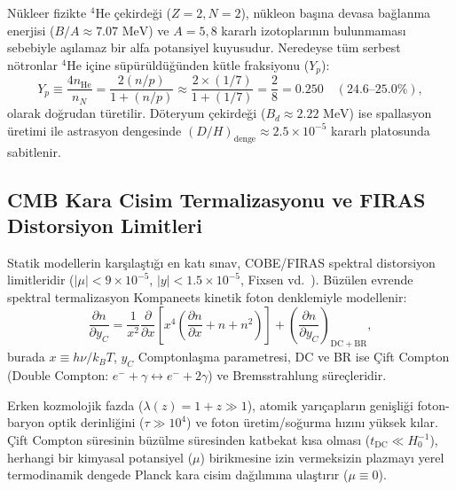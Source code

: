 \documentclass[11pt,a4paper]{article}
\begin{document}
Nükleer fizikte $^4\mathrm{He}$ çekirdeği ($Z=2, N=2$), nükleon başına devasa bağlanma enerjisi ($B/A \approx 7.07\text{ MeV}$) ve $A=5, 8$ kararlı izotoplarının bulunmaması sebebiyle aşılamaz bir alfa potansiyel kuyusudur. Neredeyse tüm serbest nötronlar $^4\mathrm{He}$ içine süpürüldüğünden kütle fraksiyonu ($Y_p$):
\begin{equation}
    Y_p \equiv \frac{4 n_{\mathrm{He}}}{n_N} = \frac{2 (n/p)}{1 + (n/p)} \approx \frac{2 \times (1/7)}{1 + (1/7)} = \frac{2}{8} = 0.250 \quad (24.6\text{--}25.0\%),
    \label{eq:yp_ispat}
\end{equation}
olarak doğrudan türetilir. Döteryum çekirdeği ($B_d \approx 2.22\text{ MeV}$) ise spallasyon üretimi ile astrasyon dengesinde $(D/H)_{\mathrm{denge}} \approx 2.5 \times 10^{-5}$ kararlı platosunda sabitlenir.

\subsection{CMB Kara Cisim Termalizasyonu ve FIRAS Distorsiyon Limitleri}
Statik modellerin karşılaştığı en katı sınav, COBE/FIRAS spektral distorsiyon limitleridir ($|\mu| < 9 \times 10^{-5}$, $|y| < 1.5 \times 10^{-5}$, Fixsen vd.~\cite{fixsen1996}). Büzülen evrende spektral termalizasyon Kompaneets kinetik foton denklemiyle modellenir:
\begin{equation}
    \frac{\partial n}{\partial y_C} = \frac{1}{x^2} \frac{\partial}{\partial x} \left[ x^4 \left( \frac{\partial n}{\partial x} + n + n^2 \right) \right] + \left( \frac{\partial n}{\partial y_C} \right)_{\mathrm{DC+BR}},
    \label{eq:kompaneets}
\end{equation}
burada $x \equiv h\nu / k_B T$, $y_C$ Comptonlaşma parametresi, DC ve BR ise Çift Compton (Double Compton: $e^- + \gamma \leftrightarrow e^- + 2\gamma$) ve Bremsstrahlung süreçleridir.

Erken kozmolojik fazda ($\lambda(z) = 1+z \gg 1$), atomik yarıçapların genişliği foton-baryon optik derinliğini ($\tau \gg 10^4$) ve foton üretim/soğurma hızını yüksek kılar. Çift Compton süresinin büzülme süresinden katbekat kısa olması ($t_{\mathrm{DC}} \ll H_0^{-1}$), herhangi bir kimyasal potansiyel ($\mu$) birikmesine izin vermeksizin plazmayı yerel termodinamik dengede Planck kara cisim dağılımına ulaştırır ($\mu \equiv 0$). 
\end{document}
